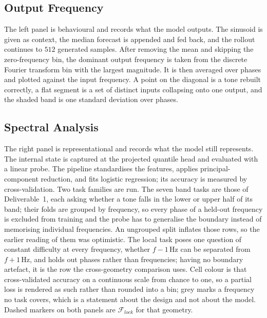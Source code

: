 

\subsection{Output Frequency}

The left panel is behavioural and records what the model outputs. The sinusoid is given as context, the median forecast is appended and fed back, and the rollout continues to $512$ generated samples. After removing the mean and skipping the zero-frequency bin, the dominant output frequency is taken from the discrete Fourier transform bin with the largest magnitude. It is then averaged over phases and plotted against the input frequency. A point on the diagonal is a tone rebuilt correctly, a flat segment is a set of distinct inputs collapsing onto one output, and the shaded band is one standard deviation over phases.

\subsection{Spectral Analysis}

The right panel is representational and records what the model still represents. The internal state is captured at the projected quantile head and evaluated with a linear probe. The pipeline standardises the features, applies principal-component reduction, and fits logistic regression; its accuracy is measured by cross-validation. Two task families are run. The seven band tasks are those of Deliverable~1, each asking whether a tone falls in the lower or upper half of its band; their folds are grouped by frequency, so every phase of a held-out frequency is excluded from training and the probe has to generalise the boundary instead of memorising individual frequencies. An ungrouped split inflates those rows, so the earlier reading of them was optimistic. The local task poses one question of constant difficulty at every frequency, whether $f-1$\,Hz can be separated from $f+1$\,Hz, and holds out phases rather than frequencies; having no boundary artefact, it is the row the cross-geometry comparison uses. Cell colour is that cross-validated accuracy on a continuous scale from chance to one, so a partial loss is rendered as such rather than rounded into a bin; grey marks a frequency no task covers, which is a statement about the design and not about the model. Dashed markers on both panels are $\mathcal F_{lock}$ for that geometry.
